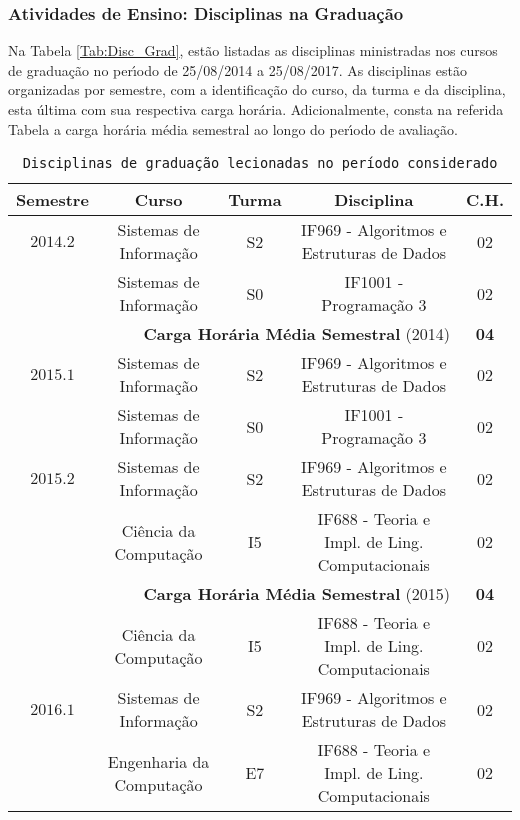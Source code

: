 \documentclass[a4paper,oneside,10pt]{article}
\newcommand{\otoprule}{\midrule[\heavyrulewidth]}
\begin{document}
\subsubsection{Atividades de Ensino: Disciplinas na Gradua\c{c}\~{a}o}
\vspace{0.3cm}

Na Tabela \ref{Tab:Disc_Grad}, estão listadas as disciplinas ministradas nos cursos de gradua\c{c}\~{a}o no per\'{\i}odo de 25/08/2014 a 25/08/2017. As disciplinas est\~{a}o organizadas por semestre, com a identifica\c{c}\~{a}o do curso, da turma e da disciplina, esta \'{u}ltima com sua respectiva carga hor\'{a}ria. Adicionalmente, consta na referida Tabela a carga hor\'{a}ria m\'{e}dia semestral ao longo do per\'{\i}odo de avalia\c{c}\~{a}o.

\begin{table}[!htpb]
\centering \small
\caption{\texttt{Disciplinas de gradua\c{c}\~{a}o lecionadas no per\'{\i}odo considerado} }
\begin{tabular}{ccccc}
\toprule
\textbf{Semestre} & \textbf{Curso} & \textbf{Turma} & \textbf{Disciplina} & \textbf{C.H.} \\
\otoprule
$2014.2$ & Sistemas de Informação & S2 & IF969 - Algoritmos e Estruturas de Dados & 02\\
  & Sistemas de Informação & S0 & IF1001 - Programação 3 & 02\\
\cmidrule{1-5}
\multicolumn{4}{r}{\textbf{Carga Hor\'{a}ria M\'{e}dia Semestral} (2014)} & \textbf{04} \\
\otoprule
$2015.1$ & Sistemas de Informação & S2 & IF969 - Algoritmos e Estruturas de Dados & 02\\
  & Sistemas de Informação & S0 & IF1001 - Programação 3 & 02\\
\cmidrule{1-5}
$2015.2$ & Sistemas de Informação & S2 & IF969 - Algoritmos e Estruturas de Dados & 02\\
  & Ciência da Computação & I5 & IF688 - Teoria e Impl. de Ling. Computacionais & 02\\
\cmidrule{1-5}
\multicolumn{4}{r}{\textbf{Carga Hor\'{a}ria M\'{e}dia Semestral} (2015)} & \textbf{04} \\
\otoprule
  & Ciência da Computação & I5 & IF688 - Teoria e Impl. de Ling. Computacionais & 02\\
$2016.1$ & Sistemas de Informação & S2 & IF969 - Algoritmos e Estruturas de Dados & 02\\
  & Engenharia da Computação & E7 & IF688 - Teoria e Impl. de Ling. Computacionais & 02\\

\end{tabular}
\end{table}
\end{document}
